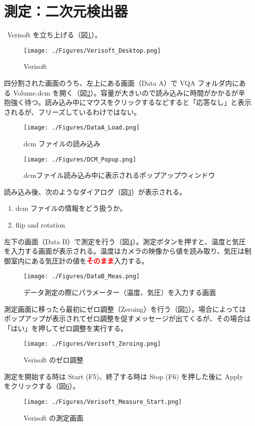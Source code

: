 \documentclass[11pt,a4paper]{jsarticle}
\newcommand{\noindot}{\noindent{$\cdot$}} %
\begin{document}
\section{測定：二次元検出器}
\noindot ~Verisoft を立ち上げる（図\ref{fig:Verisoft_Desktop}）。\par
	\begin{figure}[htbp]
		\centering
		\texttt{[image: ./Figures/Verisoft\_Desktop.png]}
		\caption{Verisoft}
		\label{fig:Verisoft_Desktop}
	\end{figure}%
\noindot 四分割された画面のうち、左上にある画面（Data A）で VQA フォルダ内にある Volume.dcm を開く（図\ref{fig:Load_DCM}）。容量が大きいので読み込みに時間がかかるが辛抱強く待つ。読み込み中にマウスをクリックするなどすると「応答なし」と表示されるが、フリーズしているわけではない。\par
	\begin{figure}[htbp]
		\centering
		\texttt{[image: ./Figures/DataA\_Load.png]}
		\caption{dcm ファイルの読み込み}
		\label{fig:Load_DCM}
	\end{figure}%
	\begin{figure}[htbp]
		\centering
		\texttt{[image: ./Figures/DCM\_Popup.png]}
		\caption{dcmファイル読み込み中に表示されるポップアップウィンドウ}
		\label{fig:DCM_Popup}
	\end{figure}%
\noindot 読み込み後、次のようなダイアログ（図\ref{fig:DCM_Popup}）が表示される。
	\begin{enumerate}
		\item dcm ファイルの情報をどう扱うか。
		\item flip and rotation
	\end{enumerate}%
\noindot 左下の画面（Data B）で測定を行う（図\ref{fig:DataB_Meas}）。測定ボタンを押すと、温度と気圧を入力する画面が表示される。温度はカメラの映像から値を読み取り、気圧は制御室内にある気圧計の値を{\bf{\textcolor{red}{そのまま}}}入力する。\par
	\begin{figure}[htbp]
		\centering
		\texttt{[image: ./Figures/DataB\_Meas.png]}
		\caption{データ測定の際にパラメーター（温度、気圧）を入力する画面}
		\label{fig:DataB_Meas}
	\end{figure}%
\noindot 測定画面に移ったら最初にゼロ調整（Zeroing）を行う（図\ref{fig:Verisoft_Zeroing}）。場合によってはポップアップが表示されてゼロ調整を促すメッセージが出てくるが、その場合は「はい」を押してゼロ調整を実行する。\par
	\begin{figure}[htbp]
		\centering
		\texttt{[image: ./Figures/Verisoft\_Zeroing.png]}
		\caption{Verisoft のゼロ調整}
		\label{fig:Verisoft_Zeroing}
	\end{figure}%
\noindot 測定を開始する時は Start (F5)、終了する時は Stop (F6) を押した後に Apply をクリックする（図\ref{fig:Verisoft_Measure_Start}）。\par
	\begin{figure}[htbp]
		\centering
		\texttt{[image: ./Figures/Verisoft\_Measure\_Start.png]}
		\caption{Verisoft の測定画面}
		\label{fig:Verisoft_Measure_Start}
	\end{figure}%
\end{document}
